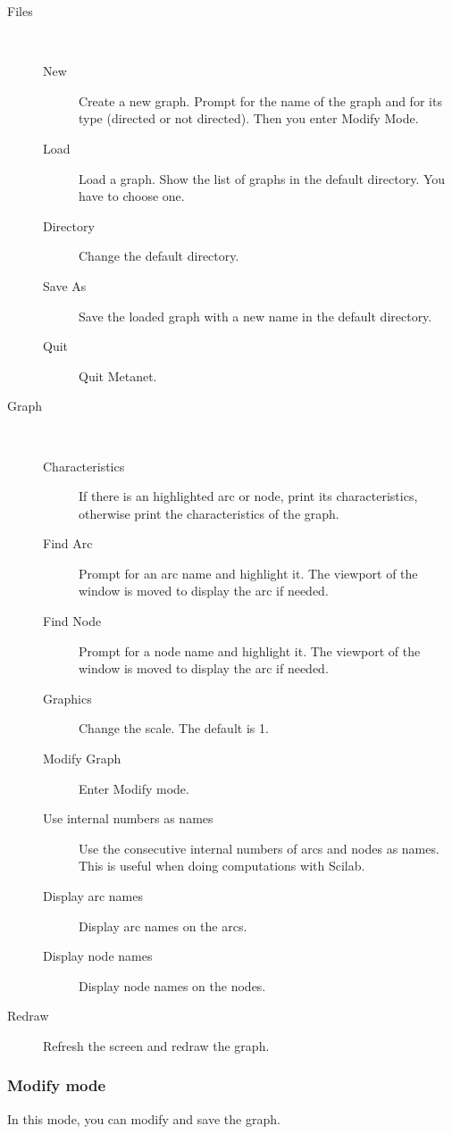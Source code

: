 \documentclass[11pt]{article}
\begin{document}
\begin{description}
\item[Files]\ 
\begin{description}
  \item[New] Create a new graph. Prompt for the name of the graph and
	for its type  (directed or not directed).
	Then you enter Modify Mode.
  \item[Load] Load a graph. Show the list of graphs in the default
	directory. You  have to choose one.
  \item[Directory] Change the default directory.
  \item[Save As] Save the loaded graph with a new name in the default 
	directory.
  \item[Quit] Quit Metanet.
\end{description}
\item[Graph]\ 
\begin{description}
  \item[Characteristics] If there is an highlighted arc or node, print its
	characteristics, otherwise print the characteristics 
	of the graph.
  \item[Find Arc] Prompt for an arc name and highlight it. The viewport of the
	window is moved to display the arc if needed.
  \item[Find Node] Prompt for a node name and highlight it. The viewport of the
	window is moved to display the arc if needed.
  \item[Graphics] Change the scale. The default is 1.
  \item[Modify Graph] Enter Modify mode.
  \item[Use internal numbers as names] Use the consecutive internal numbers of
	arcs and nodes as names. This is useful 
	when doing computations with Scilab.
  \item[Display arc names] Display arc names on the arcs.
  \item[Display node names] Display node names on the nodes.
\end{description}
\item[Redraw] Refresh the screen and redraw the graph.
\end{description}

\subsubsection{Modify mode}

In this mode, you can modify and save the graph.
\end{document}
